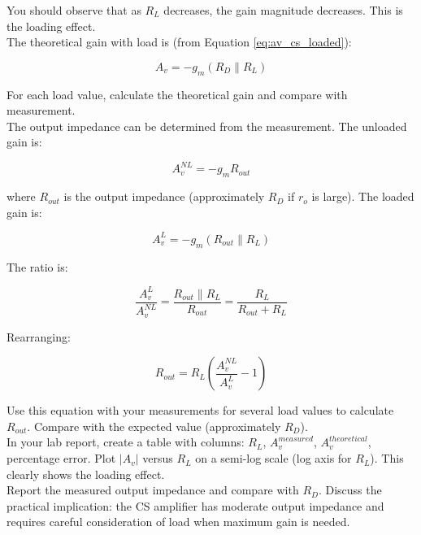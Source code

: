 \documentclass[10pt]{article}
\begin{document}
You should observe that as $R_L$ decreases, the gain magnitude decreases.  This is the loading effect. \\

The theoretical gain with load is (from Equation \ref{eq:av_cs_loaded}):

\begin{equation}
    A_v = -g_m (R_D \parallel R_L)
\end{equation}

For each load value, calculate the theoretical gain and compare with measurement.\\

The output impedance can be determined from the measurement. The unloaded gain is:

\begin{equation}
    A_v^{NL} = -g_m R_{out}
\end{equation}

where $R_{out}$ is the output impedance (approximately $R_D$ if $r_o$ is large). The loaded gain is:

\begin{equation}
    A_v^{L} = -g_m (R_{out} \parallel R_L)
\end{equation}

The ratio is:

\begin{equation}
    \frac{A_v^{L}}{A_v^{NL}} = \frac{R_{out} \parallel R_L}{R_{out}} = \frac{R_L}{R_{out} + R_L}
\end{equation}

Rearranging:

\begin{equation}
    R_{out} = R_L \left( \frac{A_v^{NL}}{A_v^{L}} - 1 \right)
\end{equation}

Use this equation with your measurements for several load values to calculate $R_{out}$. Compare with the expected value (approximately $R_D$). \\

In your lab report, create a table with columns:  $R_L$, $A_v^{measured}$, $A_v^{theoretical}$, percentage error.  Plot $|A_v|$ versus $R_L$ on a semi-log scale (log axis for $R_L$). This clearly shows the loading effect. \\

Report the measured output impedance and compare with $R_D$. Discuss the practical implication:  the CS amplifier has moderate output impedance and requires careful consideration of load when maximum gain is needed.\\
\end{document}

